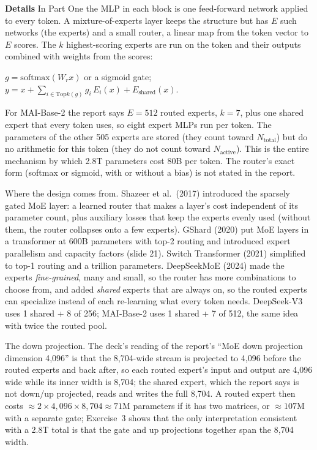 \documentclass[11pt,letterpaper]{article}
\newcommand{\para}[1]{\medskip\noindent\textbf{#1}\quad}
\newenvironment{formulas}{\begin{tcolorbox}[formulabox]}{\end{tcolorbox}}
\newcommand{\Nact}{N_{\mathrm{active}}}
\newcommand{\Ntot}{N_{\mathrm{total}}}\newcommand{\Neff}{N_{\mathrm{eff}}}
\begin{document}
\para{Details} In Part One the MLP in each block is one feed-forward network applied to every token. A mixture-of-experts layer keeps the structure but has $E$ such networks (the experts) and a small router, a linear map from the token vector to $E$ scores. The $k$ highest-scoring experts are run on the token and their outputs combined with weights from the scores:
\begin{formulas}
$g=\mathrm{softmax}(W_r x)$ or a sigmoid gate; \quad $y=x+\sum_{i\in\mathrm{Top}k(g)}g_i\,E_i(x)+E_{\mathrm{shared}}(x)$.
\end{formulas}
For MAI-Base-2 the report says $E=512$ routed experts, $k=7$, plus one shared expert that every token uses, so eight expert MLPs run per token. The parameters of the other 505 experts are stored (they count toward $\Ntot$) but do no arithmetic for this token (they do not count toward $\Nact$). This is the entire mechanism by which 2.8T parameters cost 80B per token. The router's exact form (softmax or sigmoid, with or without a bias) is not stated in the report.

Where the design comes from. Shazeer et al.\ (2017) introduced the sparsely gated MoE layer: a learned router that makes a layer's cost independent of its parameter count, plus auxiliary losses that keep the experts evenly used (without them, the router collapses onto a few experts). GShard (2020) put MoE layers in a transformer at 600B parameters with top-2 routing and introduced expert parallelism and capacity factors (slide 21). Switch Transformer (2021) simplified to top-1 routing and a trillion parameters. DeepSeekMoE (2024) made the experts \emph{fine-grained}, many and small, so the router has more combinations to choose from, and added \emph{shared} experts that are always on, so the routed experts can specialize instead of each re-learning what every token needs. DeepSeek-V3 uses 1 shared + 8 of 256; MAI-Base-2 uses 1 shared + 7 of 512, the same idea with twice the routed pool.

The down projection. The deck's reading of the report's ``MoE down projection dimension 4,096'' is that the 8,704-wide stream is projected to 4,096 before the routed experts and back after, so each routed expert's input and output are 4,096 wide while its inner width is 8,704; the shared expert, which the report says is not down/up projected, reads and writes the full 8,704. A routed expert then costs $\approx2\times4{,}096\times8{,}704\approx71$M parameters if it has two matrices, or $\approx107$M with a separate gate; Exercise~3 shows that the only interpretation consistent with a 2.8T total is that the gate and up projections together span the 8,704 width.
\end{document}
